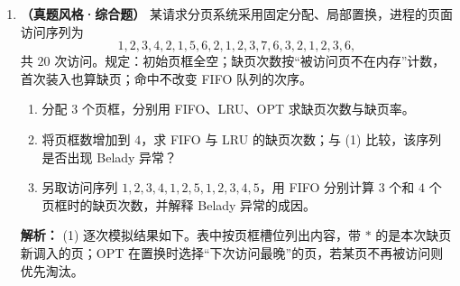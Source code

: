 \begin{enumerate}[start=7]
\item \textbf{（真题风格·综合题）} 某请求分页系统采用固定分配、局部置换，进程的页面访问序列为
\[
1,2,3,4,2,1,5,6,2,1,2,3,7,6,3,2,1,2,3,6,
\]
共 $20$ 次访问。规定：初始页框全空；缺页次数按“被访问页不在内存”计数，首次装入也算缺页；命中不改变 FIFO 队列的次序。
\begin{enumerate}
\item[(1)] 分配 $3$ 个页框，分别用 FIFO、LRU、OPT 求缺页次数与缺页率。
\item[(2)] 将页框数增加到 $4$，求 FIFO 与 LRU 的缺页次数；与 (1) 比较，该序列是否出现 Belady 异常？
\item[(3)] 另取访问序列 $1,2,3,4,1,2,5,1,2,3,4,5$，用 FIFO 分别计算 $3$ 个和 $4$ 个页框时的缺页次数，并解释 Belady 异常的成因。
\end{enumerate}

\ifshowsolutions\par\noindent\textbf{解析：}
(1) 逐次模拟结果如下。表中按页框槽位列出内容，带 $*$ 的是本次缺页新调入的页；OPT 在置换时选择“下次访问最晚”的页，若某页不再被访问则优先淘汰。


\end{enumerate}

